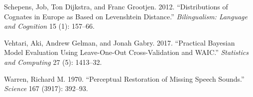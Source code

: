 \documentclass[
  man]{apa6}
\newlength{\cslhangindent}
\newenvironment{CSLReferences}[2] %
 {%
  \setlength{\parindent}{0pt}
  \ifodd #1 \everypar{\setlength{\hangindent}{\cslhangindent}}\ignorespaces\fi
  \ifnum #2 > 0
  \setlength{\parskip}{#2\baselineskip}
  \fi
 }%
 {}
\begin{document}
\begin{CSLReferences}{1}{0}
\leavevmode{}%
Schepens, Job, Ton Dijkstra, and Franc Grootjen. 2012. {``Distributions
of Cognates in Europe as Based on Levenshtein Distance.''}
\emph{Bilingualism: Language and Cognition} 15 (1): 157--66.

\leavevmode{}%
Vehtari, Aki, Andrew Gelman, and Jonah Gabry. 2017. {``Practical
Bayesian Model Evaluation Using Leave-One-Out Cross-Validation and
WAIC.''} \emph{Statistics and Computing} 27 (5): 1413--32.

\leavevmode{}%
Warren, Richard M. 1970. {``Perceptual Restoration of Missing Speech
Sounds.''} \emph{Science} 167 (3917): 392--93.

\end{CSLReferences}

\endgroup
\end{document}
